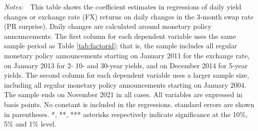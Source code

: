 \documentclass[a4paper,12pt]{article} 		%
\newcommand{\tabnote}[1]{
	\begin{tablenotes}[para,flushleft]
		\footnotesize \emph{Notes:~}~#1
	\end{tablenotes}
}
\newcommand{\textchange}[1]{\iftoggle{revised}{\textcolor{blue}{#1}}{#1}}
\providecommand{\lastobsfx}{November 2021}
\begin{document}
\begin{normalsize}
	\begin{landscape}
		\begin{table}[t]
			\begin{center}
				\caption{The Response of Asset Prices to Policy Rate Surprises: Daily Data} \label{tab:factordy} %
				\begin{threeparttable}
					\tabnote{This table shows the coefficient estimates in regressions of daily yield changes or exchange rate (FX) returns on daily changes in the 3-month swap rate (PR surprise). Daily changes are calculated around monetary policy announcements. The first column for each dependent variable uses the same sample period as Table \ref{tab:factorid}; that is, the sample includes all regular monetary policy announcements starting on January 2011 for the exchange rate, on January 2013 for 2- 10- and 30-year yields, and on December 2014 for 5-year yields. The second column for each dependent variable uses a larger sample size, including all regular monetary policy announcements starting on January 2004. The sample ends on \lastobsfx{} in all cases. All variables are expressed in basis points. No constant is included in the regressions. \textchange{Heteroskedasticity-robust} standard errors are shown in parentheses. *, **, *** asterisks respectively indicate significance at the 10\%, 5\% and 1\% level.}
				\end{threeparttable}
			\end{center}
		\end{table}
	\end{landscape}
\end{normalsize}
\end{document}
